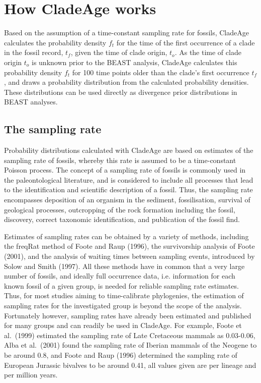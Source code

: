 \documentclass{article}
\begin{document}
\section{How CladeAge works}

Based on the assumption of a time-constant sampling rate for fossils, CladeAge calculates the probability density $f_t$ for the time of the first occurrence of a clade in the fossil record, $t_f$, given the time of clade origin, $t_o$. As the time of clade origin $t_o$ is unknown prior to the BEAST analysis, CladeAge calculates this probability density $f_t$ for 100 time points older than the clade's first occurrence $t_f$, and draws a probability distribution from the calculated probability densities. These distributions can be used directly as divergence prior distributions in BEAST analyses.

\subsection{The sampling rate}

Probability distributions calculated with CladeAge are based on estimates of the sampling rate of fossils, whereby this rate is assumed to be a time-constant Poisson process. The concept of a sampling rate of fossils is commonly used in the paleontological literature, and is considered to include all processes that lead to the identification and scientific description of a fossil. Thus, the sampling rate encompasses deposition of an organism in the sediment, fossilisation, survival of geological processes, outcropping of the rock formation including the fossil, discovery, correct taxonomic identification, and publication of the fossil find.

Estimates of sampling rates can be obtained by a variety of methods, including the freqRat method of Foote and Raup (1996), the survivorship analysis of Foote (2001), and the analysis of waiting times between sampling events, introduced by Solow and Smith (1997). All these methods have in common that a very large number of fossils, and ideally full occurrence data, i.e. information for each known fossil of a given group, is needed for reliable sampling rate estimates. Thus, for most studies aiming to time-calibrate phylogenies, the estimation of sampling rates for the investigated group is beyond the scope of the analysis. Fortunately however, sampling rates have already been estimated and published for many groups and can readily be used in CladeAge. For example, Foote et al.\ (1999) estimated the sampling rate of Late Cretaceous mammals as 0.03-0.06, Alba et al.\ (2001) found the sampling rate of Iberian mammals of the Neogene to be around 0.8, and Foote and Raup (1996) determined the sampling rate of European Jurassic bivalves to be around 0.41, all values given are per lineage and per million years.
\end{document}
